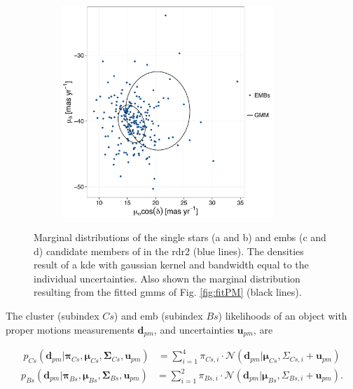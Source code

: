 \begin{figure}[ht!]
\begin{subfigure}[t]{0.48\textwidth}
        \caption{}
    \end{subfigure}
     \begin{subfigure}[t]{0.48\textwidth}
      \includegraphics[page=3,height=8cm,width=\textwidth]{background/Figures/BIC_PM_Bs_fit.pdf}
        \caption{}
    \end{subfigure}
\caption{Marginal distributions of the single stars (a and b) and \glspl{emb} (c and d) candidate members of \citet{Bouy2015} in the \gls{rdr2} (blue lines). The densities result of a \gls{kde} with gaussian kernel and bandwidth equal to the individual uncertainties. Also shown the marginal distribution resulting from the fitted \glspl{gmm} of Fig. \ref{fig:fitPM} (black lines).}
\label{fig:fitPMprojections}
\end{figure}



The cluster (subindex $Cs$) and \gls{emb} (subindex $Bs$) likelihoods of an object with proper motions measurements $\mathbf{d}_{pm}$, and uncertainties $\mathbf{u}_{pm}$, are

\begin{align}\label{eq:lik-pm-cs}
p_{Cs}(\mathbf{d}_{pm}| \boldsymbol{\pi}_{Cs}, \boldsymbol{\mu}_{Cs},\boldsymbol{\Sigma}_{Cs},\mathbf{u}_{pm})
&= \sum_{i=1}^4\pi_{Cs,i}\cdot \mathcal{N}(\mathbf{d}_{pm} | \boldsymbol{\mu}_{Cs},\Sigma_{Cs,i}+\mathbf{u}_{pm})
\end{align}
\begin{align}
p_{Bs}(\mathbf{d}_{pm}| \boldsymbol{\pi}_{Bs}, \boldsymbol{\mu}_{Bs},\boldsymbol{\Sigma}_{Bs},\mathbf{u}_{pm})
&= \sum_{i=1}^2\pi_{Bs,i}\cdot \mathcal{N}(\mathbf{d}_{pm} | \boldsymbol{\mu}_{Bs},\Sigma_{Bs,i}+\mathbf{u}_{pm}).
\label{eq:lik-pm-bs}
\end{align}

